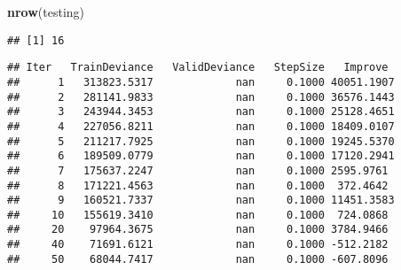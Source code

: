 \documentclass[]{article}
\newenvironment{Shaded}{\begin{snugshade}}{\end{snugshade}}
\newcommand{\CommentTok}[1]{\textcolor[rgb]{0.56,0.35,0.01}{\textit{#1}}}
\newcommand{\ControlFlowTok}[1]{\textcolor[rgb]{0.13,0.29,0.53}{\textbf{#1}}}
\newcommand{\DataTypeTok}[1]{\textcolor[rgb]{0.13,0.29,0.53}{#1}}
\newcommand{\KeywordTok}[1]{\textcolor[rgb]{0.13,0.29,0.53}{\textbf{#1}}}
\newcommand{\NormalTok}[1]{#1}
\newcommand{\OperatorTok}[1]{\textcolor[rgb]{0.81,0.36,0.00}{\textbf{#1}}}
\newcommand{\StringTok}[1]{\textcolor[rgb]{0.31,0.60,0.02}{#1}}
\begin{document}
\begin{Shaded}
\begin{Highlighting}[]
\KeywordTok{nrow}\NormalTok{(testing)}
\end{Highlighting}
\end{Shaded}

\begin{verbatim}
## [1] 16
\end{verbatim}

\begin{Shaded}
\end{Shaded}

\begin{verbatim}
## Iter   TrainDeviance   ValidDeviance   StepSize   Improve
##      1   313823.5317             nan     0.1000 40051.1907
##      2   281141.9833             nan     0.1000 36576.1443
##      3   243944.3453             nan     0.1000 25128.4651
##      4   227056.8211             nan     0.1000 18409.0107
##      5   211217.7925             nan     0.1000 19245.5370
##      6   189509.0779             nan     0.1000 17120.2941
##      7   175637.2247             nan     0.1000 2595.9761
##      8   171221.4563             nan     0.1000  372.4642
##      9   160521.7337             nan     0.1000 11451.3583
##     10   155619.3410             nan     0.1000  724.0868
##     20    97964.3675             nan     0.1000 3784.9466
##     40    71691.6121             nan     0.1000 -512.2182
##     50    68044.7417             nan     0.1000 -607.8096
\end{verbatim}
\end{document}
